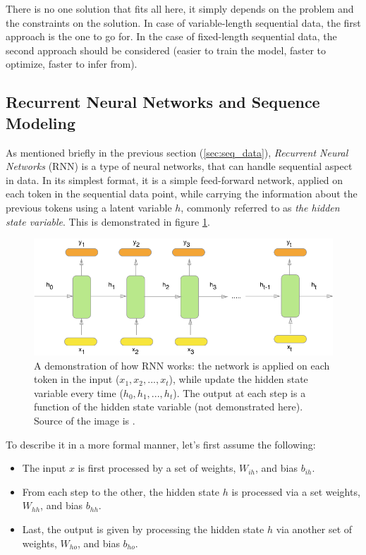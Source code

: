 \par There is no one solution that fits all here, it simply depends on the problem and the constraints on the solution. In case of variable-length sequential data, the first approach is the one to go for. In the case of fixed-length sequential data, the second approach should be considered (easier to train the model, faster to optimize, faster to infer from).

\subsection{Recurrent Neural Networks and Sequence Modeling} \label{sec:RNN}
As mentioned briefly in the previous section (\ref{sec:seq_data}), \textit{Recurrent Neural Networks} (RNN) is a type of neural networks, that can handle sequential aspect in data. In its simplest format, it is a simple feed-forward network, applied on each token in the sequential data point, while carrying the information about the previous tokens using a latent variable $h$, commonly referred to as \textit{the hidden state variable}. This is demonstrated in figure \ref{fig:basic_rnn_model}.

\begin{figure}
    \centering
    \includegraphics[width=\textwidth]{images/gbem/basic_rnn.png}
    \caption{A demonstration of how RNN works: the network is applied on each token in the input ($x_1, x_2, ..., x_t$), while update the hidden state variable every time ($h_0, h_1, ..., h_t$). The output at each step is a function of the hidden state variable (not demonstrated here). Source of the image is \citep{howrnnworks}.}
    \label{fig:basic_rnn_model}
\end{figure}

\par To describe it in a more formal manner, let's first assume the following:
\begin{itemize}
    \item The input $x$ is first processed by a set of weights, $W_{ih}$, and bias $b_{ih}$.
    \item From each step to the other, the hidden state $h$ is processed via a set weights, $W_{hh}$, and bias $b_{hh}$.
    \item Last, the output is given by processing the hidden state $h$ via another set of weights, $W_{ho}$, and bias $b_{ho}$.
\end{itemize}

